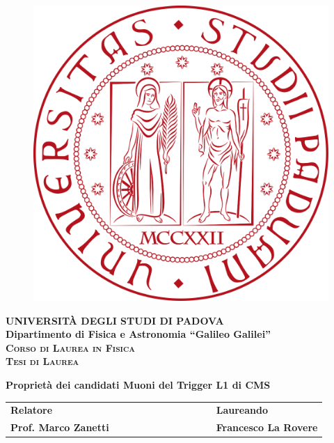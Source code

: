 \documentclass[a4paper, 11pt]{book}
\begin{document}
\begin{titlepage}
\vspace{5mm}
\begin{figure}[hbtp]
\centering
\includegraphics[scale=.13]{../Immagini/unipd_logo.png}
\end{figure}
\vspace{5mm}
\begin{center}
{{\huge{\textsc{\bf UNIVERSIT\`A DEGLI STUDI DI PADOVA}}}\\}
\vspace{5mm}
{\Large{\bf Dipartimento di Fisica e Astronomia ``Galileo Galilei''}} \\
\vspace{5mm}
{\Large{\textsc{\bf Corso di Laurea in Fisica}}}\\
\vspace{20mm}
{\Large{\textsc{\bf Tesi di Laurea}}}\\
\vspace{30mm}
\begin{spacing}{3}
{\LARGE \textbf{Proprietà dei candidati Muoni del Trigger L1 di CMS}}\\
\end{spacing}
\vspace{8mm}
\end{center}

\vspace{20mm}
\begin{spacing}{2}
\begin{tabular}{ l  c  c c c  cc c c c c  l }
{\Large{\bf Relatore}} &&&&&&&&&&& {\Large{\bf Laureando}}\\
{\Large{\bf Prof. Marco Zanetti}} &&&&&&&&&&& {\Large{\bf Francesco La Rovere}}\\


\end{tabular}
\end{spacing}
\end{titlepage}
\end{document}
